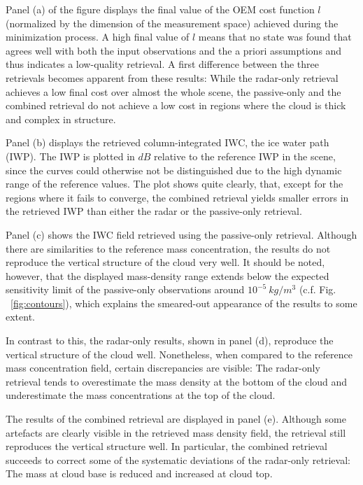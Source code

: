 \documentclass[journal abbreviation, manuscript]{copernicus}
\begin{document}
Panel (a) of the figure displays the final value of the OEM cost function $l$
(normalized by the dimension of the measurement space) achieved during the
minimization process. A high final value of $l$ means that no state was found
that agrees well with both the input observations and the a priori assumptions
and thus indicates a low-quality retrieval. A first difference between the three
retrievals becomes apparent from these results: While the radar-only retrieval
achieves a low final cost over almost the whole scene, the passive-only and the
combined retrieval do not achieve a low cost in regions where the cloud is thick
and complex in structure.

Panel (b) displays the retrieved column-integrated IWC, the ice water path
(IWP). The IWP is plotted in $\unit{dB}$ relative to the reference IWP in the
scene, since the curves could otherwise not be distinguished due to the high
dynamic range of the reference values. The plot shows quite clearly, that,
except for the regions where it fails to converge, the combined retrieval yields
smaller errors in the retrieved IWP than either the radar or the passive-only
retrieval.

Panel (c) shows the IWC field retrieved using the passive-only retrieval.
Although there are similarities to the reference mass concentration, the results
do not reproduce the vertical structure of the cloud very well. It should be
noted, however, that the displayed mass-density range extends below the expected
sensitivity limit of the passive-only observations around
$10^{-5}\ \unit{kg/m^3}$ (c.f. Fig. ~\ref{fig:contours}), which explains the
smeared-out appearance of the results to some extent.

In contrast to this, the radar-only results, shown in panel (d), reproduce the
vertical structure of the cloud well. Nonetheless, when compared to the
reference mass concentration field, certain discrepancies are visible: The
radar-only retrieval tends to overestimate the mass density at the bottom
of the cloud and underestimate the mass concentrations at the top of the cloud.

The results of the combined retrieval are displayed in panel (e). Although some
artefacts are clearly visible in the retrieved mass density field, the retrieval
still reproduces the vertical structure well. In particular, the combined
retrieval succeeds to correct some of the systematic deviations of the
radar-only retrieval: The mass at cloud base is reduced and increased at cloud
top.
\end{document}
